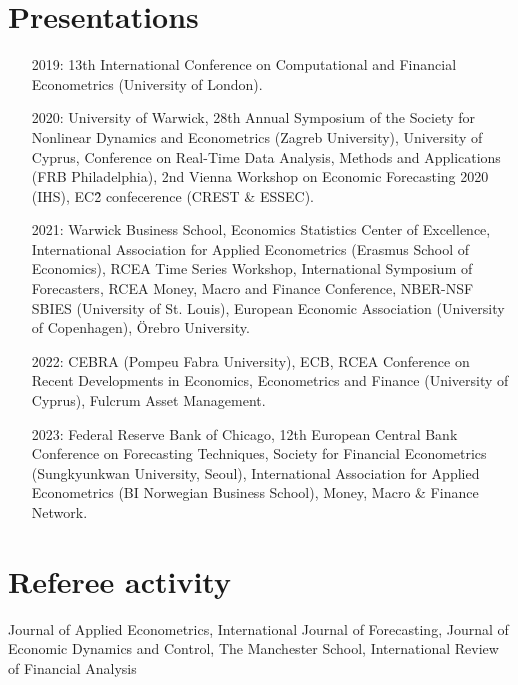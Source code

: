 \documentclass[a4paper,12pt]{article}
\begin{document}
\section{Presentations}
\begin{itemize}
    \item[2019:] 13th International Conference on Computational and Financial Econometrics (University of London).
    \item[2020:] University of Warwick, 28th Annual Symposium of the Society for Nonlinear Dynamics and Econometrics (Zagreb University), University of Cyprus, Conference on Real-Time Data Analysis, Methods and Applications (FRB Philadelphia), 2nd Vienna Workshop on Economic Forecasting 2020 (IHS), EC\^2 confecerence (CREST \& ESSEC).
    \item[2021:] Warwick Business School, Economics Statistics Center of Excellence, International Association for Applied Econometrics (Erasmus School of Economics),  RCEA Time Series Workshop, International Symposium of Forecasters,  RCEA Money, Macro and Finance Conference, NBER-NSF SBIES (University of St. Louis), European Economic Association (University of Copenhagen), \"Orebro University.
    \item[2022:] CEBRA (Pompeu Fabra University), ECB, RCEA Conference on Recent Developments in Economics, Econometrics and Finance (University of Cyprus), Fulcrum Asset Management.
    \item[2023:] Federal Reserve Bank of Chicago, 12th European Central Bank Conference on Forecasting Techniques, Society for Financial Econometrics (Sungkyunkwan University, Seoul), International Association for Applied Econometrics (BI Norwegian Business School), Money, Macro \& Finance Network. 
\end{itemize}

\section{Referee activity}
Journal of Applied Econometrics, International Journal of Forecasting, Journal of Economic Dynamics and Control, The Manchester School, International Review of Financial Analysis
\end{document}
